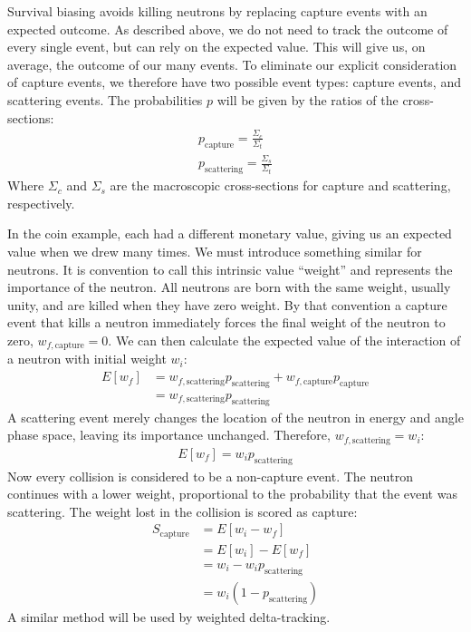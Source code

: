 Survival biasing avoids killing neutrons by replacing capture
events with an expected outcome. As described above, we do not need to
track the outcome of every single event, but can rely on the expected
value. This will give us, on average, the outcome of our many
events. To eliminate our explicit consideration of capture events,
we therefore have two possible event types: capture events, and
scattering events. The probabilities $p$ will be given by the
ratios of the cross-sections:
\begin{align*}
  p_{\mathrm{capture}} = \frac{\Sigma_{c}}{\Sigma_t} \\
  p_{\mathrm{scattering}} = \frac{\Sigma_{s}}{\Sigma_t}
\end{align*}
Where $\Sigma_{c}$ and $\Sigma_{s}$ are the macroscopic cross-sections
for capture and scattering, respectively.

In the coin example, each had a different monetary value, giving us an
expected value when we drew many times. We must introduce something
similar for neutrons. It is convention to call this intrinsic value
``weight'' and represents the importance of the neutron. All neutrons
are born with the same weight, usually unity, and are killed when they
have zero weight. By that convention a capture event that kills a
neutron immediately forces the final weight of the neutron to zero,
$w_{f,\mathrm{capture}} = 0$. We can then calculate the expected
value of the interaction of a neutron with initial weight $w_i$:
\begin{align*}
  E[w_f] &= w_{f,\mathrm{scattering}}p_\mathrm{scattering} +
           w_{f,\mathrm{capture}}p_\mathrm{capture} \\
  &= w_{f,\mathrm{scattering}}p_\mathrm{scattering}
\end{align*}
A scattering event merely changes the location of the neutron in
energy and angle phase space, leaving its importance
unchanged. Therefore, $w_{f,\mathrm{scattering}} = w_i$:
\begin{align*}
  E[w_f] = w_ip_\mathrm{scattering} 
\end{align*}
Now every collision is considered to be a non-capture event. The
neutron continues with a lower weight, proportional to the probability
that the event was scattering. The weight lost in the collision is
scored as capture:
\begin{align*}
  S_\mathrm{capture} &= E[w_i - w_f] \\
  &= E[w_i] - E[w_f] \\
&= w_i - w_ip_\mathrm{scattering} \\
&= w_i(1-p_\mathrm{scattering})
\end{align*}
A similar method will be used by weighted delta-tracking.

